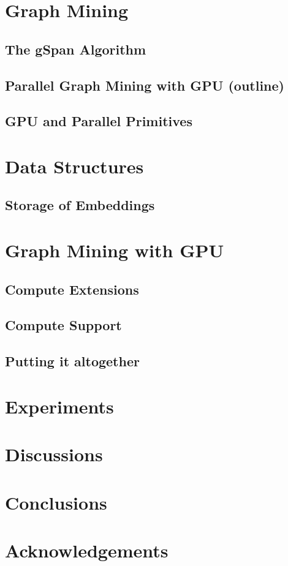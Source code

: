 \documentclass{sigkddExp}
\begin{document}
\section{Graph Mining}
\subsection{The gSpan Algorithm}
\subsection{Parallel Graph Mining with GPU (outline)}
\subsection{GPU and Parallel Primitives}


\section{Data Structures}
\subsection{Storage of Embeddings}

\section{Graph Mining with GPU}
\subsection{Compute Extensions}
\subsection{Compute Support}
\subsection{Putting it altogether}

\section{Experiments}
\section{Discussions}
\section{Conclusions}

\section{Acknowledgements}
\fi


%
%

\end{document}
